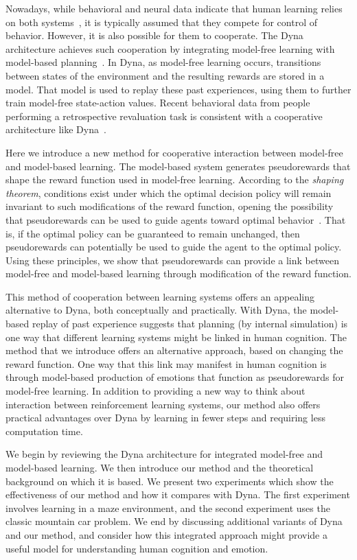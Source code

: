 \documentclass[letterpaper]{article}
\begin{document}
Nowadays, while behavioral and neural data indicate that human learning relies on both systems~\cite{daw2005uncertainty, glascher2010states, dayan2014model}, it is typically assumed that they compete for control of behavior. However, it is also possible for them to cooperate. The Dyna architecture achieves such cooperation by integrating model-free learning with model-based planning~\cite{sutton1991dyna}. In Dyna, as model-free learning occurs, transitions between states of the environment and the resulting rewards are stored in a model. That model is used to replay these past experiences, using them to further train model-free state-action values. Recent behavioral data from people performing a retrospective revaluation task is consistent with a cooperative architecture like Dyna~\cite{gershman2014retrospective}.

Here we introduce a new method for cooperative interaction between model-free and model-based learning. The model-based system generates pseudorewards that shape the reward function used in model-free learning. According to the \textit{shaping theorem}, conditions exist under which the optimal decision policy will remain invariant to such modifications of the reward function, opening the possibility that pseudorewards can be used to guide agents toward optimal behavior~\cite{ng1999policy}. That is, if the optimal policy can be guaranteed to remain unchanged, then pseudorewards can potentially be used to guide the agent to the optimal policy. Using these principles, we show that pseudorewards can provide a link between model-free and model-based learning through modification of the reward function.

This method of cooperation between learning systems offers an appealing alternative to Dyna, both conceptually and practically. With Dyna, the model-based replay of past experience suggests that planning (by internal simulation) is one way that different learning systems might be linked in human cognition. The method that we introduce offers an alternative approach, based on changing the reward function. One way that this link may manifest in human cognition is through model-based production of emotions that function as pseudorewards for model-free learning. In addition to providing a new way to think about interaction between reinforcement learning systems, our method also offers practical advantages over Dyna by learning in fewer steps and requiring less computation time.

We begin by reviewing the Dyna architecture for integrated model-free and model-based learning. We then introduce our method and the theoretical background on which it is based. We present two experiments which show the effectiveness of our method and how it compares with Dyna. The first experiment involves learning in a maze environment, and the second experiment uses the classic mountain car problem. We end by discussing additional variants of Dyna and our method, and consider how this integrated approach might provide a useful model for understanding human cognition and emotion.
\end{document}
